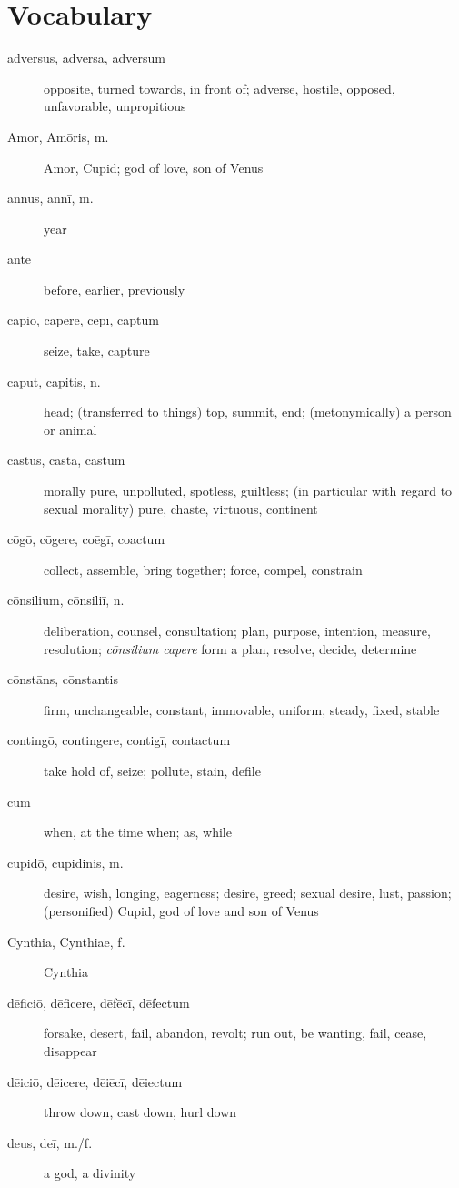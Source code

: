 \chapter*{Vocabulary}

\begin{description}
    \item[adversus, adversa, adversum] opposite, turned towards, in front of; adverse, hostile, opposed, unfavorable, unpropitious
    \item[Amor, Amōris, m.] Amor, Cupid; god of love, son of Venus
    \item[annus, annī, m.] year
    \item[ante] before, earlier, previously
    \item[capiō, capere, cēpī, captum] seize, take, capture
    \item[caput, capitis, n.] head; (transferred to things) top, summit, end; (metonymically) a person or animal
    \item[castus, casta, castum] morally pure, unpolluted, spotless, guiltless; (in particular with regard to sexual morality) pure, chaste, virtuous, continent
    \item[cōgō, cōgere, coēgī, coactum] collect, assemble, bring together; force, compel, constrain
    \item[cōnsilium, cōnsiliī, n.] deliberation, counsel, consultation; plan, purpose, intention, measure, resolution; \textit{cōnsilium capere} form a plan, resolve, decide, determine
    \item[cōnstāns, cōnstantis] firm, unchangeable, constant, immovable, uniform, steady, fixed, stable
    \item[contingō, contingere, contigī, contactum] take hold of, seize; pollute, stain, defile
    \item[cum] when, at the time when; as, while
    \item[cupidō, cupidinis, m.] desire, wish, longing, eagerness; desire, greed; sexual desire, lust, passion; (personified) Cupid, god of love and son of Venus
    \item[Cynthia, Cynthiae, f.] Cynthia
    \item[dēficiō, dēficere, dēfēcī, dēfectum] forsake, desert, fail, abandon, revolt; run out, be wanting, fail, cease, disappear
    \item[dēiciō, dēicere, dēiēcī, dēiectum] throw down, cast down, hurl down
    \item[deus, deī, m./f.] a god, a divinity

\end{description}
